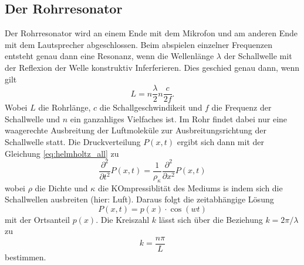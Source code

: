 \subsection{Der Rohrresonator}
Der Rohrresonator wird an einem Ende mit dem Mikrofon und am anderen Ende mit dem Lautsprecher abgeschlossen.
Beim abspielen einzelner Frequenzen entsteht genau dann eine Resonanz, wenn die Wellenlänge $\lambda$ der Schallwelle
mit der Reflexion der Welle konstruktiv Inferferieren. Dies geschied genau dann, wenn gilt
\begin{equation}
    L=n\frac{\lambda}{2}n\frac{c}{2f}.
\end{equation}
Wobei $L$ die Rohrlänge, $c$ die Schallgeschwindikeit und $f$ die Frequenz der Schallwelle und $n$ ein ganzahliges Vielfaches ist.
Im Rohr findet dabei nur eine waagerechte Ausbreitung der Luftmoleküle zur Ausbreitungsrichtung der Schallwelle statt.
Die Druckverteilung $P(x,t)$ ergibt sich dann mit der Gleichung \ref{eq:helmholtz_all} zu
\begin{equation}
    \frac{\partial^2}{\partial t^2}P(x,t)=\frac{1}{\rho_\kappa}\frac{\partial^2}{\partial x^2}P(x,t)
\end{equation}
\label{sec:Theorie}
wobei $\rho$ die Dichte und $\kappa$ die KOmpressiblität des Mediums is indem sich die Schallwellen ausbreiten (hier: Luft).
Daraus folgt die zeitabhängige Lösung
\begin{equation}
    P(x,t)=p(x)\cdot \cos{(wt)}
    \label{eq:rohr_loe}
\end{equation}
mit der Ortsanteil $p(x)$.
Die Kreiszahl $k$ lässt sich über die Beziehung $k=2\pi/\lambda$ zu
\begin{equation}
    k=\frac{n\pi}{L}
\end{equation}
bestimmen.

